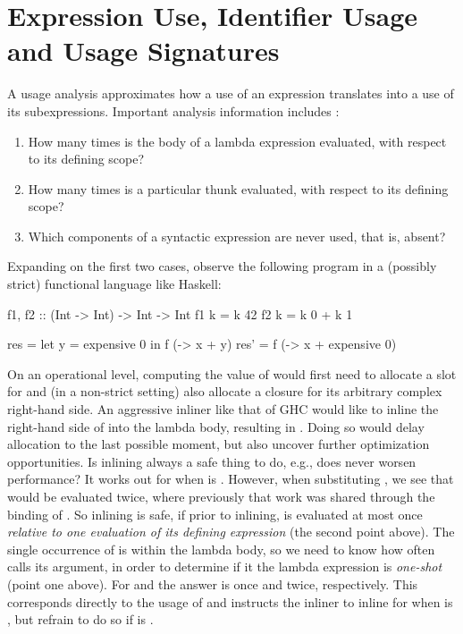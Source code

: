 \section{Expression Use, Identifier Usage and Usage Signatures}


A usage analysis approximates how a use of an expression translates into a use of its subexpressions. Important analysis information includes \parencite{card}:
\begin{enumerate}
\item How many times is the body of a lambda expression evaluated, with respect to its defining scope?
\item How many times is a particular thunk evaluated, with respect to its defining scope?
\item Which components of a syntactic expression are never used, that is, absent?
\end{enumerate}

Expanding on the first two cases, observe the following program in a (possibly strict) functional language like Haskell:

\begin{haskellcode}
f1, f2 :: (Int -> Int) -> Int -> Int
f1 k = k 42
f2 k = k 0 + k 1

res = let y = expensive 0 in f (\x -> x + y)
res' = f (\x -> x + expensive 0)
\end{haskellcode}

On an operational level, computing the value of  would first need to allocate a slot for  and (in a non-strict setting) also allocate a closure for its arbitrary complex right-hand side. 
An aggressive inliner like that of GHC would like to inline the right-hand side of  into the lambda body, resulting in . Doing so would delay allocation to the last possible moment, but also uncover further optimization opportunities. 
Is inlining  always a safe thing to do, e.g., does never worsen performance? It works out for when  is . However, when substituting , we see that  would be evaluated twice, where previously that work was shared through the binding of .
So inlining  is safe, if prior to inlining,  is evaluated at most once \emph{relative to one evaluation of its defining expression} (the second point above). The single occurrence of  is within the lambda body, so we need to know how often  calls its argument, in order to determine if it the lambda expression is \emph{one-shot} (point one above). 
For  and  the answer is once and twice, respectively. This corresponds directly to the usage of  and instructs the inliner to inline  for when  is , but refrain to do so if  is .

